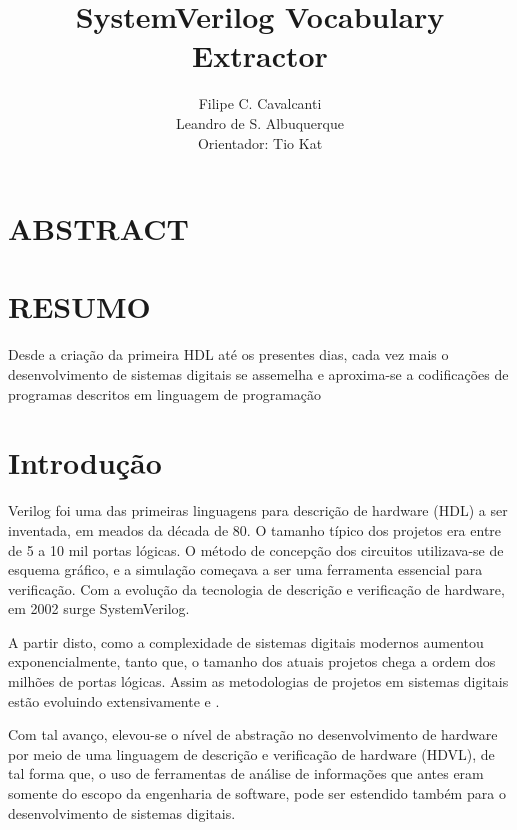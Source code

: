 \documentclass[12pt, twocolumn, a4paper]{article}
\begin{document}
	\title{SystemVerilog Vocabulary Extractor}
	\author{Filipe C. Cavalcanti\\ Leandro de S. Albuquerque\\
	Orientador: Tio Kat}
	\maketitle
	
	\section{ABSTRACT}
	
	\section{RESUMO}
	\quad Desde a criação da primeira HDL até os presentes dias, cada vez mais o desenvolvimento de sistemas digitais se assemelha e aproxima-se a codificações de programas descritos em linguagem de programação  
	
	\section{Introdução}

\quad Verilog foi uma das primeiras linguagens para descrição de hardware (HDL) a ser inventada, em meados da década de 80. O tamanho típico dos projetos era entre de 5 a 10 mil portas lógicas. O método de concepção dos circuitos utilizava-se de esquema gráfico, e a simulação começava a ser uma ferramenta essencial para verificação\cite{sutherland2006}. Com a evolução da tecnologia de descrição e verificação de hardware, em 2002 surge SystemVerilog. 

A partir disto, como a complexidade de sistemas digitais modernos aumentou exponencialmente, tanto que, o tamanho dos atuais projetos chega a ordem dos milhões de portas lógicas. Assim as metodologias de projetos em sistemas digitais estão evoluindo extensivamente \cite{Marc-Andre} e \cite{Hahanov2008}.

Com tal avanço, elevou-se o nível de abstração no desenvolvimento de hardware por meio de uma linguagem de descrição e verificação de hardware (HDVL), de tal forma que, o uso de ferramentas de análise de informações que antes eram somente do escopo da engenharia de software, pode ser estendido também para o desenvolvimento de sistemas digitais.
\end{document}
